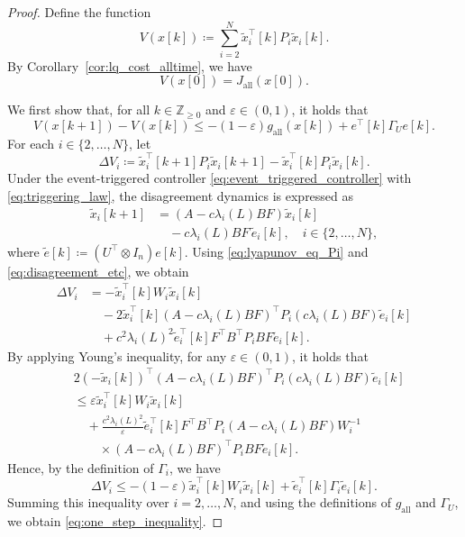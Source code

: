 \documentclass[letterpaper,10pt,conference]{ieeeconf}
\newcommand{\Z}{\mathbb{Z}}
\begin{document}
\begin{proof}
  Define the function
  \begin{equation}
    V(x[k]) \coloneqq \sum_{i=2}^N \tilde{x}_i^\top[k] P_i \tilde{x}_i[k].
  \end{equation}
  By Corollary~\ref{cor:lq_cost_alltime}, we have
  \begin{equation}
    V(x[0]) = J_{\mathrm{all}}(x[0]).
  \end{equation}

  We first show that, for all $k \in \Z_{\geq 0}$ and $\varepsilon \in (0,1)$, it holds that
  \begin{equation}
    V(x[k+1]) - V(x[k])
    \leq -(1-\varepsilon) g_{\mathrm{all}}(x[k]) + e^\top[k] \Gamma_U e[k].
    \label{eq:one_step_inequality}
  \end{equation}
  For each $i \in \{2,\dots,N\}$, let
  \begin{equation}
    \Delta V_i
    \coloneqq
    \tilde{x}_i^\top[k+1] P_i \tilde{x}_i[k+1] - \tilde{x}_i^\top[k] P_i \tilde{x}_i[k].
  \end{equation}
  Under the event-triggered controller \eqref{eq:event_triggered_controller} with \eqref{eq:triggering_law}, the disagreement dynamics is expressed as
  \begin{align} \label{eq:disagreement_etc}
    \tilde{x}_i[k+1]
    &= (A - c\lambda_i(L)BF)\tilde{x}_i[k] \\
    &\quad - c\lambda_i(L)BF\,\tilde{e}_i[k], \quad i \in \{2,\dots,N\},
  \end{align}
  where $\tilde{e}[k] \coloneqq (U^\top \otimes I_n)e[k]$.
  Using \eqref{eq:lyapunov_eq_Pi} and \eqref{eq:disagreement_etc}, we obtain
  \begin{align}
    \Delta V_i
    &= - \tilde{x}_i^\top[k] W_i \tilde{x}_i[k] \\
    &\quad - 2\tilde{x}_i^\top[k] (A - c\lambda_i(L)BF)^\top P_i (c\lambda_i(L)BF)\tilde{e}_i[k] \\
    &\quad + c^2\lambda_i(L)^2 \tilde{e}_i^\top[k] F^\top B^\top P_i B F \tilde{e}_i[k].
  \end{align}
  By applying Young's inequality, for any $\varepsilon \in (0,1)$, it holds that
  \begin{align}
    & 2\left(-\tilde{x}_i[k]\right)^\top (A - c\lambda_i(L)BF)^\top P_i (c\lambda_i(L)BF)\tilde{e}_i[k] \\
    &\leq
    \varepsilon \tilde{x}_i^\top[k] W_i \tilde{x}_i[k] \\
    &\quad + \frac{c^2\lambda_i(L)^2}{\varepsilon} \tilde{e}_i^\top[k] F^\top B^\top P_i (A - c\lambda_i(L)BF) W_i^{-1} \\
    &\qquad \times (A - c\lambda_i(L)BF)^\top P_i B F \tilde{e}_i[k].
  \end{align}
  Hence, by the definition of $\Gamma_i$, we have
  \begin{equation}
    \Delta V_i
    \le
    -
    (1-\varepsilon)\tilde{x}_i^\top[k] W_i \tilde{x}_i[k]
    +
    \tilde{e}_i^\top[k] \Gamma_i \tilde{e}_i[k].
  \end{equation}
  Summing this inequality over $i=2,\dots,N$, and using the definitions of $g_{\mathrm{all}}$ and $\Gamma_U$, we obtain \eqref{eq:one_step_inequality}.


\end{proof}
\end{document}
